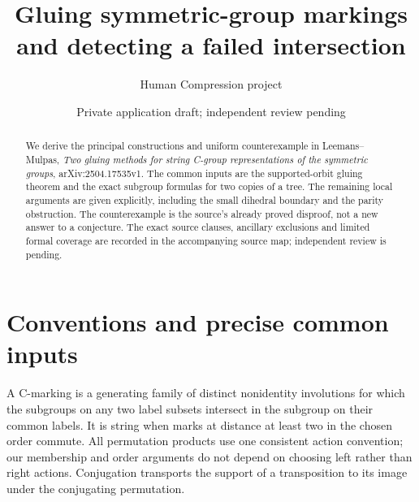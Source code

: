 \documentclass[a4paper,11pt]{article}
\title{Gluing symmetric-group markings and detecting a failed intersection}
\author{Human Compression project}\date{Private application draft; independent review pending}
\begin{document}
\maketitle
\begin{abstract}
We derive the principal constructions and uniform counterexample in
Leemans--Mulpas, \emph{Two gluing methods for string C-group representations
of the symmetric groups}, arXiv:2504.17535v1. The common inputs are the
supported-orbit gluing theorem and the exact subgroup formulas for two copies
of a tree. The remaining local arguments are given explicitly, including the
small dihedral boundary and the parity obstruction. The counterexample is
the source's already proved disproof, not a new answer to a conjecture.
The exact source clauses, ancillary exclusions and limited formal coverage
are recorded in the accompanying source map; independent review is pending.
\end{abstract}

\section{Conventions and precise common inputs}
A C-marking is a generating family of distinct nonidentity involutions for
which the subgroups on any two label subsets intersect in the subgroup on
their common labels. It is string when marks at distance at least two in the
chosen order commute. All permutation products use one consistent action
convention; our membership and order arguments do not depend on choosing
left rather than right actions. Conjugation transports the support of a
transposition to its image under the conjugating permutation.
\end{document}
